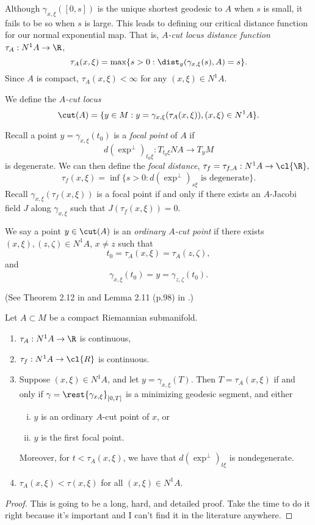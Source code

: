 Although $\gamma_{x,\xi}([0,s])$ is the unique shortest geodesic to $A$ when $s$ is small, it fails to be so when $s$ is large.  This leads to defining our critical distance function for our normal exponential map.  That is, \textit{$A$-cut locus distance function} $\tau_A:N^1A\to\R$,
$$\tau_A(x,\xi)=\max\{s>0:\dist_g(\gamma_{x,\xi}(s),A)=s\}.$$
Since $A$ is compact, $\tau_A(x,\xi)<\infty$ for any $(x,\xi)\in N^1A$.

We define the \textit{$A$-cut locus}
$$\cut(A)=\{y\in M:y=\gamma_{x,\xi}(\tau_A(x,\xi)), (x,\xi)\in N^1A\}.$$

Recall a point $y=\gamma_{x,\xi}(t_0)$ is a \textit{focal point} of $A$ if
$$d(\exp^\perp)_{t_0\xi}:T_{t_0\xi}NA\to T_yM$$
is degenerate.  We can then define the \textit{focal distance}, $\tau_f=\tau_{f,A}:N^1A\to\cl{\R},$
$$\tau_f(x,\xi)=\inf\{s>0:d(\exp^\perp)_{s\xi}\text{ is degenerate}\}.$$
Recall $\gamma_{x,\xi}(\tau_f(x,\xi))$ is a focal point if and only if there exists an $A$-Jacobi field $J$ along $\gamma_{x,\xi}$ such that $J(\tau_f(x,\xi))=0$.


We say a point $y\in\cut(A)$ is an \textit{ordinary $A$-cut point} if there exists $(x,\xi),(z,\zeta)\in N^1A$, $x\neq z$ such that
$$t_0=\tau_A(x,\xi)=\tau_A(z,\zeta),$$
and
$$\gamma_{x,\xi}(t_0)=y=\gamma_{z,\zeta}(t_0).$$


\begin{thm}\label{thm:klingLemSubman}
(See Theorem 2.12 in \cite{kachalov2001inverse} and Lemma 2.11 (p.98) in \cite{sakai1996riemannian}.)

Let $A\subset M$ be a compact Riemannian submanifold.
\begin{enumerate}
\item $\tau_A:N^1A\to\R$ is continuous,
\item $\tau_f:N^1A\to\cl{R}$ is continuous.
\item Suppose $(x,\xi)\in N^1A$, and let $y=\gamma_{x,\xi}(T)$.  Then $T=\tau_A(x,\xi)$ if and only if $\gamma=\rest{\gamma_{x,\xi}}_{[0,T]}$ is a minimizing geodesic segment, and either
	\begin{enumerate}[i.]
	\item $y$ is an ordinary $A$-cut point of $x$, or
	\item $y$ is the first focal point.
	\end{enumerate}
	Moreover, for $t<\tau_A(x,\xi)$, we have that $d(\exp^\perp)_{t\xi}$ is nondegenerate.
\item $\tau_A(x,\xi)<\tau(x,\xi)$ for all $(x,\xi)\in N^1A$.
\end{enumerate}
\end{thm}

\begin{proof}
This is going to be a long, hard, and detailed proof.  Take the time to do it right because it's important and I can't find it in the literature anywhere.
\end{proof}


















